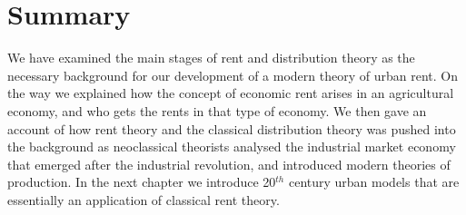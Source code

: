 




\section{Summary}
We have examined the main stages of rent and distribution theory
as the necessary background for our development %
of a modern theory of urban rent. On the way we explained how the concept of economic rent arises in an agricultural economy, and who gets the rents in that type of economy. We then gave an account of how rent theory and the classical distribution theory was pushed into the background as neoclassical theorists analysed the industrial market economy that emerged after the industrial revolution, and introduced modern theories of production. In the next chapter we introduce 20$^{th}$ century urban models that are essentially an application of classical rent theory.

